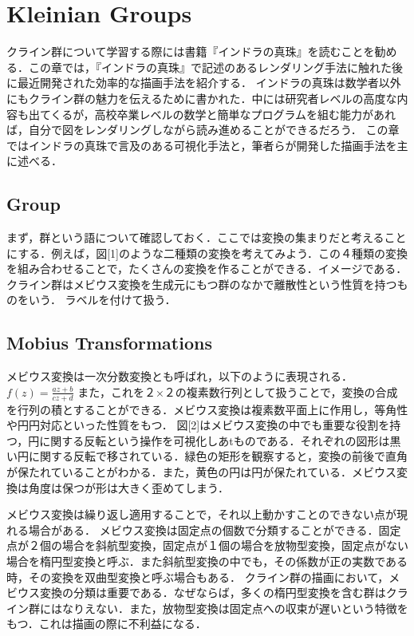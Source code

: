 
\section{Kleinian Groups}
クライン群について学習する際には書籍『インドラの真珠』を読むことを勧める．この章では，『インドラの真珠』で記述のあるレンダリング手法に触れた後に最近開発された効率的な描画手法を紹介する．
インドラの真珠は数学者以外にもクライン群の魅力を伝えるために書かれた．中には研究者レベルの高度な内容も出てくるが，高校卒業レベルの数学と簡単なプログラムを組む能力があれば，自分で図をレンダリングしながら読み進めることができるだろう．
この章ではインドラの真珠で言及のある可視化手法と，筆者らが開発した描画手法を主に述べる．

\subsection{Group}
まず，群という語について確認しておく．ここでは変換の集まりだと考えることにする．例えば，図[1]のような二種類の変換を考えてみよう．この４種類の変換を組み合わせることで，たくさんの変換を作ることができる．イメージである．
クライン群はメビウス変換を生成元にもつ群のなかで離散性という性質を持つものをいう．
ラベルを付けて扱う．

\subsection{Mobius Transformations}
メビウス変換は一次分数変換とも呼ばれ，以下のように表現される．
$f(z) = \frac{az + b}{cz + d}$
また，これを２×２の複素数行列として扱うことで，変換の合成を行列の積とすることができる．メビウス変換は複素数平面上に作用し，等角性や円円対応といった性質をもつ．
図[2]はメビウス変換の中でも重要な役割を持つ，円に関する反転という操作を可視化しあtものである．それぞれの図形は黒い円に関する反転で移されている．緑色の矩形を観察すると，変換の前後で直角が保たれていることがわかる．また，黄色の円は円が保たれている．メビウス変換は角度は保つが形は大きく歪めてしまう．

メビウス変換は繰り返し適用することで，それ以上動かすことのできない点が現れる場合がある．
メビウス変換は固定点の個数で分類することができる．固定点が２個の場合を斜航型変換，固定点が１個の場合を放物型変換，固定点がない場合を楕円型変換と呼ぶ．また斜航型変換の中でも，その係数が正の実数である時，その変換を双曲型変換と呼ぶ場合もある．
クライン群の描画において，メビウス変換の分類は重要である．なぜならば，多くの楕円型変換を含む群はクライン群にはなりえない．また，放物型変換は固定点への収束が遅いという特徴をもつ．これは描画の際に不利益になる．

